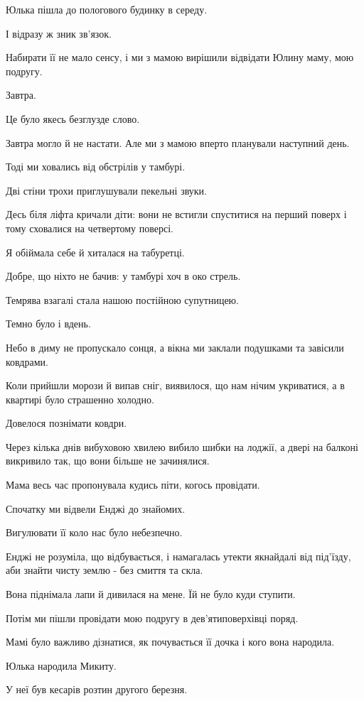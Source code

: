 Юлька пішла до пологового будинку в середу. \par
І відразу ж зник зв'язок. \par
Набирати її не мало сенсу, і ми з мамою вирішили відвідати Юлину маму, мою подругу. \par
Завтра. \par
Це було якесь безглузде слово.\par
Завтра могло й не настати. Але ми з мамою вперто планували наступний день.\par
Тоді ми ховались від обстрілів у тамбурі.  \par
Дві стіни трохи приглушували пекельні звуки. \par
Десь біля ліфта кричали діти: вони не встигли спуститися на перший поверх і тому сховалися на четвертому поверсі. \par
Я обіймала себе й хиталася на табуретці. \par
Добре, що ніхто не бачив: у тамбурі хоч в око стрель. \par
Темрява взагалі стала нашою постійною супутницею.\par
Темно було і вдень. \par
Небо в  диму не пропускало сонця, а вікна ми заклали подушками та завісили ковдрами. \par
Коли прийшли морози й випав сніг, виявилося, що нам нічим укриватися, а в квартирі було страшенно холодно. \par
Довелося познімати ковдри.\par
Через кілька днів вибуховою хвилею вибило шибки на лоджії, а двері на балконі викривило так, що вони більше не зачинялися.\par
Мама весь час пропонувала кудись піти, когось провідати. \par
Спочатку ми відвели  Енджі до знайомих.\par
Вигулювати її коло нас було небезпечно. \par
Енджі не розуміла, що відбувається, і намагалась утекти якнайдалі від під'їзду, аби знайти чисту землю -  без смиття  та скла.\par
Вона піднімала лапи й дивилася на мене. Їй не було куди ступити.\par
Потім ми пішли провідати мою подругу в дев'ятиповерхівці поряд. \par
Мамі було важливо дізнатися, як почувається її дочка і кого вона народила.\par
Юлька народила Микиту. \par
У неї був кесарів розтин другого березня.\par
